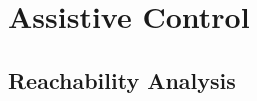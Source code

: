 \documentclass[letterpaper, 10 pt, conference]{ieeeconf}  %
\newcommand\NB[1]{$\spadesuit$\footnote{NB: #1}}
\begin{document}
  
  
  




\section{Assistive Control} \label{sec:adapt}


\subsection{Reachability Analysis}
\end{document}
